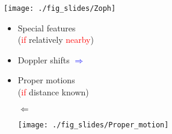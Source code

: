 \documentclass[xcolor=dvipsnames,professionalfonts, aspectratio=169]{beamer}
\begin{document}
\begin{frame}
  \begin{center}
    \begin{minipage}[hb]{0.25\linewidth}
      \vspace*{-95pt}
      \texttt{[image: ./fig\_slides/Zoph]}\\
    \end{minipage} \vspace*{30pt}
    \begin{minipage}[hb]{0.4\linewidth}
      \begin{itemize}\Large
      \item<1->[$\Leftarrow$] Special features\\
        {\small \centering (\textcolor{red}{if} relatively \textcolor{red}{nearby})}
        \vspace*{5pt}
      \item<2->[] Doppler shifts \hfill
        \textcolor{Blue}{$\Rightarrow$}\\
        \vspace*{5pt}
      \item<3>[] Proper motions\\
        {\small \centering (\textcolor{red}{if} distance known)}
        \begin{center}
          \begin{sideways}
            $\Leftarrow$
          \end{sideways}
          \linebreak \hspace*{-20pt}\texttt{[image: ./fig\_slides/Proper\_motion]}
        \end{center}
      \end{itemize}
    \end{minipage}
\end{center}
\end{frame}
\end{document}
